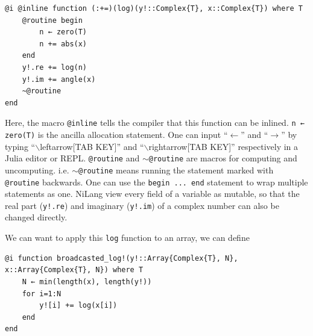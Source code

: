 \documentclass{article}
\newcommand{\<}{\langle}
\renewcommand{\>}{\rangle}
\theoremstyle{definition}\newtheorem{definition}{\textit{Definition}}
\begin{document}
\begin{minipage}{.88\columnwidth}
\begin{lstlisting}[mathescape=true,caption={Reversible complex valued log function $y\mathrel{+}=\log(|x|) + i{\rm Arg}(x)$.},label={lst:complex}]
@i @inline function (:+=)(log)(y!::Complex{T}, x::Complex{T}) where T
    @routine begin
        n ← zero(T)
        n += abs(x)
    end
    y!.re += log(n)
    y!.im += angle(x)
    ~@routine
end
\end{lstlisting}
\end{minipage}

Here, the macro \texttt{@inline} tells the compiler that this function can be inlined. \texttt{n ← zero(T)} is the ancilla allocation statement. One can input ``$\leftarrow$'' and ``$\rightarrow$'' by typing ``$\backslash$leftarrow[TAB KEY]'' and ``$\backslash$rightarrow[TAB KEY]'' respectively in a Julia editor or REPL.
\texttt{@routine} and \texttt{$\sim$@routine} are macros for computing and uncomputing. i.e. \texttt{$\sim$@routine} means running the statement marked with \texttt{@routine} backwards.
One can use the \texttt{begin ... end} statement to wrap multiple statements as one.
NiLang view every field of a variable as mutable, so that the real part (\texttt{y!.re}) and imaginary (\texttt{y!.im}) of a complex number can also be changed directly.

We can want to apply this \texttt{log} function to an array, we can define
\begin{minipage}{.88\columnwidth}
\begin{lstlisting}[mathescape=true,caption={Applying the log function to an array.},label={lst:bcast-complex}]
@i function broadcasted_log!(y!::Array{Complex{T}, N}, x::Array{Complex{T}, N}) where T
    N ← min(length(x), length(y!))
    for i=1:N
        y![i] += log(x[i])
    end
end
\end{lstlisting}
\end{minipage}
\end{document}
